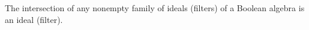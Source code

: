 The intersection of any nonempty family of ideals (filters) of a Boolean algebra is an ideal (filter).
